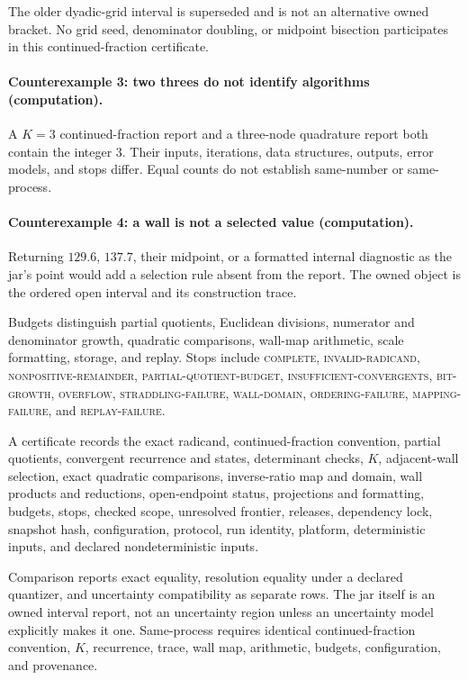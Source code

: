 The older dyadic-grid interval is superseded and is not an alternative owned bracket.  No grid seed, denominator
doubling, or midpoint bisection participates in this continued-fraction certificate.

\paragraph{Counterexample 3: two threes do not identify algorithms (computation).}
A \(K=3\) continued-fraction report and a three-node quadrature report both contain the integer \(3\).  Their inputs,
iterations, data structures, outputs, error models, and stops differ.  Equal counts do not establish same-number or
same-process.

\paragraph{Counterexample 4: a wall is not a selected value (computation).}
Returning \(129.6\), \(137.7\), their midpoint, or a formatted internal diagnostic as the jar's point would add a
selection rule absent from the report.  The owned object is the ordered open interval and its construction trace.

Budgets distinguish partial quotients, Euclidean divisions, numerator and denominator growth, quadratic comparisons,
wall-map arithmetic, scale formatting, storage, and replay.  Stops include \textsc{complete},
\textsc{invalid-radicand}, \textsc{nonpositive-remainder}, \textsc{partial-quotient-budget},
\textsc{insufficient-convergents}, \textsc{bit-growth}, \textsc{overflow}, \textsc{straddling-failure},
\textsc{wall-domain}, \textsc{ordering-failure}, \textsc{mapping-failure}, and \textsc{replay-failure}.

A certificate records the exact radicand, continued-fraction convention, partial quotients, convergent recurrence and
states, determinant checks, \(K\), adjacent-wall selection, exact quadratic comparisons, inverse-ratio map and domain,
wall products and reductions, open-endpoint status, projections and formatting, budgets, stops, checked scope,
unresolved frontier, releases, dependency lock, snapshot hash, configuration, protocol, run identity, platform,
deterministic inputs, and declared nondeterministic inputs.

Comparison reports exact equality, resolution equality under a declared quantizer, and uncertainty compatibility as
separate rows.  The jar itself is an owned interval report, not an uncertainty region unless an uncertainty model
explicitly makes it one.  Same-process requires identical continued-fraction convention, \(K\), recurrence, trace,
wall map, arithmetic, budgets, configuration, and provenance.


